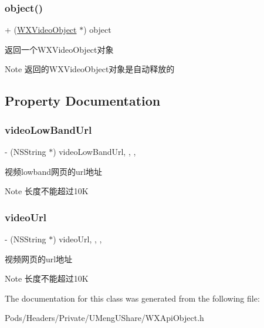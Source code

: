 \subsubsection{\texorpdfstring{object()}{object()}\hspace{0.1cm}{\footnotesize\ttfamily [3/3]}}
{\footnotesize\ttfamily + (\mbox{\hyperlink{interface_w_x_video_object}{W\+X\+Video\+Object}} $\ast$) object \begin{DoxyParamCaption}{ }\end{DoxyParamCaption}}



返回一个\+W\+X\+Video\+Object对象 

\begin{DoxyNote}{Note}
返回的\+W\+X\+Video\+Object对象是自动释放的 
\end{DoxyNote}


\subsection{Property Documentation}
\mbox{\label{interface_w_x_video_object_aaed3f2fe0eb30e7491441b3e13b4977d}} 
\subsubsection{\texorpdfstring{video\+Low\+Band\+Url}{videoLowBandUrl}}
{\footnotesize\ttfamily -\/ (N\+S\+String $\ast$) video\+Low\+Band\+Url\hspace{0.3cm}{\ttfamily [read]}, {\ttfamily [write]}, {\ttfamily [nonatomic]}, {\ttfamily [retain]}}

视频lowband网页的url地址 \begin{DoxyNote}{Note}
长度不能超过10K 
\end{DoxyNote}
\mbox{\label{interface_w_x_video_object_ad830b0c9c0e4afae7a75d14e0ab130d3}} 
\subsubsection{\texorpdfstring{video\+Url}{videoUrl}}
{\footnotesize\ttfamily -\/ (N\+S\+String $\ast$) video\+Url\hspace{0.3cm}{\ttfamily [read]}, {\ttfamily [write]}, {\ttfamily [nonatomic]}, {\ttfamily [retain]}}

视频网页的url地址 \begin{DoxyNote}{Note}
长度不能超过10K 
\end{DoxyNote}


The documentation for this class was generated from the following file\+:\begin{DoxyCompactItemize}
\item 
Pods/\+Headers/\+Private/\+U\+Meng\+U\+Share/W\+X\+Api\+Object.\+h\end{DoxyCompactItemize}
